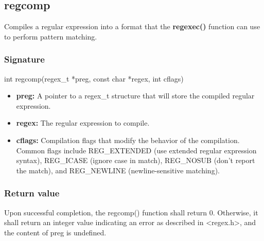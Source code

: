 \documentclass{report}
\begin{document}
    \pagebreak 
    \bigbreak \noindent 
    \subsection{regcomp}
    \bigbreak \noindent 
    \begin{concept}
        Compiles a regular expression into a format that the \textbf{regexec()} function can use to perform pattern matching.
    \end{concept}
    \bigbreak \noindent 
    \subsubsection{Signature}
    \bigbreak \noindent 
    \begin{cppcode}
       int regcomp(regex_t *preg, const char *regex, int cflags) 
    \end{cppcode}
    \begin{itemize}
        \item \textbf{preg:} A pointer to a regex\_t structure that will store the compiled regular expression.
        \item \textbf{regex:} The regular expression to compile.
        \item \textbf{cflags:} Compilation flags that modify the behavior of the compilation. Common flags include REG\_EXTENDED (use extended regular expression syntax), REG\_ICASE (ignore case in match), REG\_NOSUB (don't report the match), and REG\_NEWLINE (newline-sensitive matching).
    \end{itemize}
    \bigbreak \noindent 
    \subsubsection{Return value}
    \bigbreak \noindent 
    Upon successful completion, the regcomp() function shall return 0. Otherwise, it shall return an integer value indicating an error as described in <regex.h>, and the content of preg is undefined.

    \bigbreak \noindent 
\end{document}
